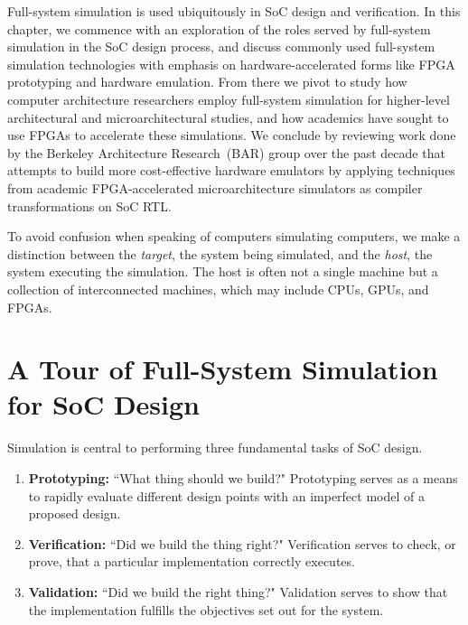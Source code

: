 Full-system simulation is used ubiquitously in SoC design and verification. In
this chapter, we commence with an exploration of the roles served by
full-system simulation
in the SoC design process, and discuss commonly used full-system
simulation technologies with emphasis on hardware-accelerated forms like FPGA
prototyping and hardware emulation. From there we pivot to study how computer
architecture researchers employ full-system simulation for higher-level
architectural and microarchitectural studies, and how academics have sought to
use FPGAs to accelerate these simulations.
We conclude by reviewing work done by the Berkeley Architecture
Research~(BAR) group over the past decade that attempts to build more
cost-effective hardware emulators by applying techniques from academic
FPGA-accelerated microarchitecture simulators as compiler transformations on
SoC RTL.

To avoid confusion when speaking of computers simulating computers, we make a distinction between the \emph{target}, the system
being simulated, and the \emph{host}, the system
executing the simulation. The host is often not a single machine but
a collection of interconnected machines, which may include CPUs,
GPUs, and FPGAs.

\section{A Tour of Full-System Simulation for SoC Design}

Simulation is central to performing three fundamental tasks of SoC design.

\begin{enumerate}

    \item \textbf{Prototyping:} ``What thing should we
        build?" Prototyping serves as a means to rapidly evaluate different
        design points with an imperfect model of a proposed design.

    \item \textbf{Verification:} ``Did we build the thing right?" Verification
        serves to check, or prove, that a particular implementation
        correctly executes.

    \item \textbf{Validation:} ``Did we build the right thing?" Validation
        serves to show that the implementation fulfills the objectives set out
        for the system.

\end{enumerate}

